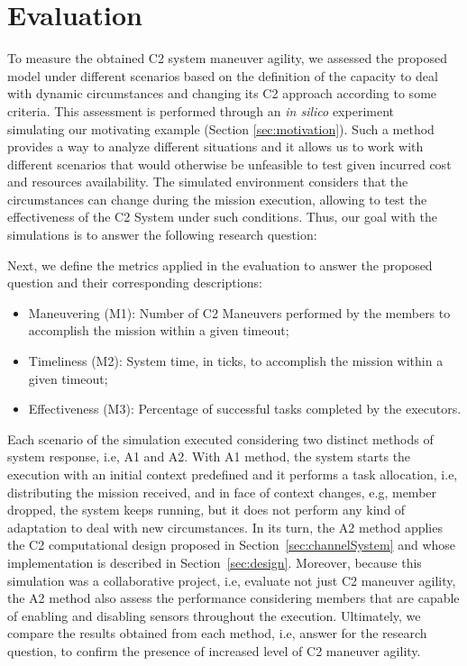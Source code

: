 \section{Evaluation}
\label{sec:evaluation}

To measure the obtained C2 system maneuver agility, we assessed the proposed model under different scenarios based on the definition of the capacity to deal with dynamic circumstances and changing its C2 approach according to some criteria. This assessment is performed through an \textit{in silico} experiment~\cite{simulation01} simulating our motivating example (Section \ref{sec:motivation}). Such a method provides a way to analyze different situations and it allows us to work with different scenarios that would otherwise be unfeasible to test given incurred cost and resources availability. The simulated environment considers that the circumstances can change during the mission execution, allowing to test the effectiveness of the C2 System under such conditions. Thus, our goal with the simulations is to answer the following research question:
 
\begin{center}
\end{center}

Next, we define the metrics applied in the evaluation to answer the proposed question and their corresponding descriptions:
\begin{itemize}
    \item Maneuvering (M1): Number of C2 Maneuvers performed by the members to accomplish the mission within a given timeout;
    \item Timeliness (M2): System time, in ticks, to accomplish the mission within a given timeout;
    \item Effectiveness (M3): Percentage of successful tasks completed by the executors.
\end{itemize}

Each scenario of the simulation executed considering two distinct methods of system response, i.e, A1 and A2. With A1 method, the system starts the execution with an initial context predefined and it performs a task allocation, i.e, distributing the mission received, and in face of context changes, e.g, member dropped, the system keeps running, but it does not perform any kind of adaptation to deal with new circumstances. In its turn, the A2 method applies the C2 computational design proposed in Section~\ref{sec:channelSystem} and whose implementation is described in Section~\ref{sec:design}. Moreover, because this simulation was a collaborative project, i.e, evaluate not just C2 maneuver agility, the A2 method also assess the performance considering members that are capable of enabling and disabling sensors throughout the execution. Ultimately, we compare the results obtained from each method, i.e, answer for the research question, to confirm the presence of increased level of C2 maneuver agility.

